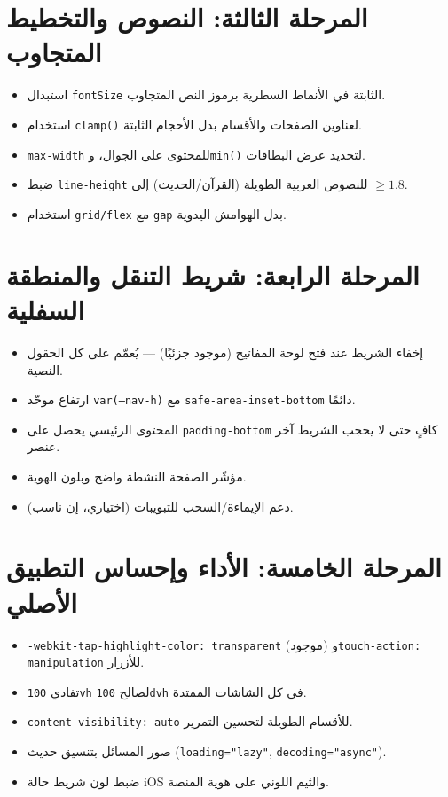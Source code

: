 \documentclass[11pt]{article}
\begin{document}
\section{المرحلة الثالثة: النصوص والتخطيط المتجاوب}

\begin{itemize}
  \item استبدال \texttt{fontSize} الثابتة في الأنماط السطرية برموز النص المتجاوب.
  \item استخدام \texttt{clamp()} لعناوين الصفحات والأقسام بدل الأحجام الثابتة.
  \item \texttt{max-width} للمحتوى على الجوال، و\texttt{min()} لتحديد عرض البطاقات.
  \item ضبط \texttt{line-height} للنصوص العربية الطويلة (القرآن/الحديث) إلى $\ge 1.8$.
  \item استخدام \texttt{grid/flex} مع \texttt{gap} بدل الهوامش اليدوية.
\end{itemize}

\section{المرحلة الرابعة: شريط التنقل والمنطقة السفلية}

\begin{itemize}
  \item إخفاء الشريط عند فتح لوحة المفاتيح (موجود جزئيًا) — يُعمّم على كل الحقول النصية.
  \item ارتفاع موحّد \texttt{var(--nav-h)} مع \texttt{safe-area-inset-bottom} دائمًا.
  \item المحتوى الرئيسي يحصل على \texttt{padding-bottom} كافٍ حتى لا يحجب الشريط آخر عنصر.
  \item مؤشّر الصفحة النشطة واضح وبلون الهوية.
  \item دعم الإيماءة/السحب للتبويبات (اختياري، إن ناسب).
\end{itemize}

\section{المرحلة الخامسة: الأداء وإحساس التطبيق الأصلي}

\begin{itemize}
  \item \texttt{-webkit-tap-highlight-color: transparent} (موجود) و\texttt{touch-action: manipulation} للأزرار.
  \item تفادي \texttt{100vh} لصالح \texttt{100dvh} في كل الشاشات الممتدة.
  \item \texttt{content-visibility: auto} للأقسام الطويلة لتحسين التمرير.
  \item صور المسائل بتنسيق حديث (\texttt{loading="lazy"}, \texttt{decoding="async"}).
  \item ضبط لون شريط حالة iOS والثيم اللوني على هوية المنصة.
\end{itemize}
\end{document}

